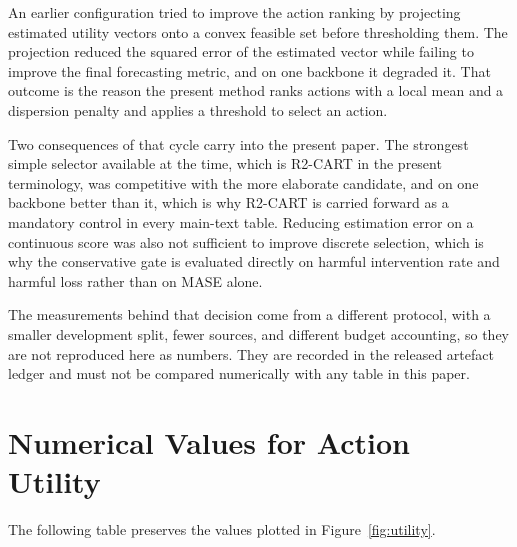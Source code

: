 \documentclass{article}
\begin{document}
An earlier configuration tried to improve the action ranking by projecting estimated utility
vectors onto a convex feasible set before thresholding them. The projection reduced the squared
error of the estimated vector while failing to improve the final forecasting metric, and on one
backbone it degraded it. That outcome is the reason the present method ranks actions with a
local mean and a dispersion penalty and applies a threshold to select an action.

Two consequences of that cycle carry into the present paper. The strongest simple selector
available at the time, which is R2-CART in the present terminology, was competitive with the
more elaborate candidate, and on one backbone better than it, which is why R2-CART is carried
forward as a mandatory control in every main-text table. Reducing estimation error on a
continuous score was also not sufficient to improve discrete selection, which is why the
conservative gate is evaluated directly on harmful intervention rate and harmful loss rather
than on MASE alone.

The measurements behind that decision come from a different protocol, with a smaller
development split, fewer sources, and different budget accounting, so they are not reproduced
here as numbers. They are recorded in the released artefact ledger and must not be compared
numerically with any table in this paper.

\clearpage
\section{Numerical Values for Action Utility}
\label{app:main-values}
The following table preserves the values plotted in Figure~\ref{fig:utility}.
\end{document}
